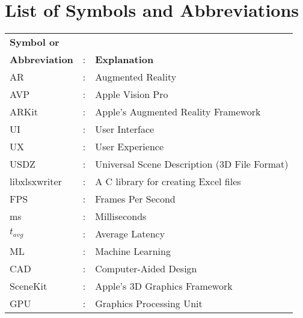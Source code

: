 \chapter*{List of Symbols and Abbreviations}

\begin{tabular}{lcl}
    \textbf{Symbol or}&&\\
    \textbf{Abbreviation} &:& \textbf{Explanation}\\
    
    AR &:& Augmented Reality\\
    AVP &:& Apple Vision Pro\\
    ARKit &:& Apple's Augmented Reality Framework\\
    UI &:& User Interface\\
    UX &:& User Experience\\
    USDZ &:& Universal Scene Description (3D File Format)\\
    libxlsxwriter &:& A C library for creating Excel files\\
    FPS &:& Frames Per Second\\
    ms &:& Milliseconds\\
    $t_{avg}$ &:& Average Latency\\
    ML &:& Machine Learning\\
    CAD &:& Computer-Aided Design\\
    SceneKit &:& Apple’s 3D Graphics Framework\\
    GPU &:& Graphics Processing Unit\\
    
\end{tabular}

\clearpage
